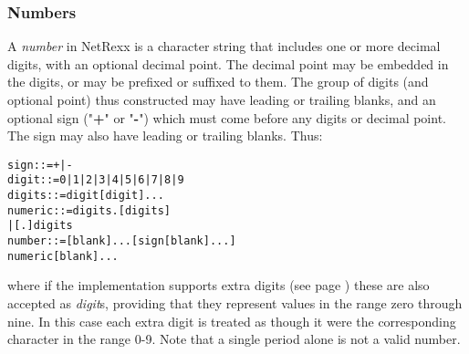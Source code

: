 \subsubsection{Numbers}\label{"id"}
 A \emph{number} in NetRexx is a character string that includes one or
more decimal digits, with an optional decimal point.
The decimal point may be embedded in the digits, or may be prefixed or
suffixed to them.
The group of digits (and optional point) thus constructed may have
leading or trailing blanks, and an optional sign ("\textbf{+}"
or "\textbf{-}") which must come before any digits or decimal
point.
The sign may also have leading or trailing blanks.
Thus:
\begin{alltt}
sign    ::=  + | -
digit   ::=  0 | 1 | 2 | 3 | 4 | 5 | 6 | 7 | 8 | 9
digits  ::=  digit [digit]...
numeric ::=  digits . [digits]
             | [.] digits
number  ::=  [blank]... [sign [blank]...]
             numeric [blank]...
\end{alltt}

where if the implementation supports  extra digits (see page \pageref{refsyms}) 
these are also accepted as \emph{digit}s, providing that they
represent values in the range zero through nine.
In this case each extra digit is treated as though it were
the corresponding character in the range 0-9.
 Note that a single period alone is not a valid number.
